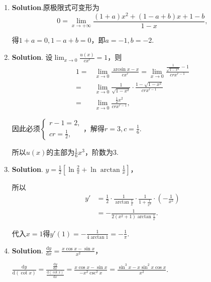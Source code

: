 \documentclass[../Main.tex]{subfiles}
\begin{document}
\begin{enumerate}
    \item \textbf{Solution}.原极限式可变形为
          \[
              0=\lim_{x\to+\infty}\frac{(1+a)x^{2}+(1-a+b)x+1-b}{1-x},
          \]

          得$1+a=0,1-a+b=0$，即$a=-1,b=-2$.

    \item \textbf{Solution}. 设$\lim_{x\to0}\frac{u(x)}{cx^{r}}=1$，则
          \[
              \begin{aligned}
                  1= & \lim_{x\to0}\frac{\arcsin x- x}{cx^{r}}=\lim_{x\to0}\frac{\frac{1}{\sqrt{1-x^{2}}}-1}{crx^{r-1}} \\
                  =  & \lim_{x\to0}\frac{1}{\sqrt{1-x^2}}\cdot\frac{1-\sqrt{1-x^2}}{crx^{r-1}}                          \\
                  =  & \lim_{x\to0}\frac{\frac{1}{2}x^2}{crx^{r-1}},
              \end{aligned}
          \]

          因此必须$\begin{cases}
                  r-1=2, \\
                  cr=\frac{1}{2},
              \end{cases}$，解得$r=3,c=\frac{1}{6}$.

          所以$u(x)$的主部为$\frac{1}{6}x^{3}$，阶数为3.

    \item \textbf{Solution}. $y=\frac{1}{2}\left[\ln\frac{2}{\pi}+\ln\arctan\frac{1}{x}
                  \right]$，

          所以
          \[
              \begin{aligned}
                  y' & =\frac{1}{2}\cdot\frac{1}{\arctan\frac{1}{x}}\cdot\frac{1}{1+\frac{1}{x^{2}}}\cdot\left(-\frac{1}{x^{2}}\right) \\
                     & = -\frac{1}{2(x^{2}+1)\arctan\frac{1}{x}}.
              \end{aligned}
          \]

          代入$x=1$得$y'(1)=-\frac{1}{4\arctan 1}=-\frac{1}{\pi}$.

    \item \textbf{Solution}. $\frac{\mathrm{d}y}{\mathrm{d}x}=\frac{x\cos x-\sin x}{x^{2}}$，

          $\frac{\mathrm{d}y}{\mathrm{d}(\cot x)}=\frac{\frac{\mathrm{d}y}{\mathrm{d}x}}{\frac{\mathrm{d}(\cot
                      x)}{\mathrm{d}x}}=\frac{x\cos x-\sin x}{-x^{2}\csc^{2} x}=\frac{\sin^{3} x-x\sin^{2}
                  x\cos x}{x^{2}}$.


\end{enumerate}
\end{document}
